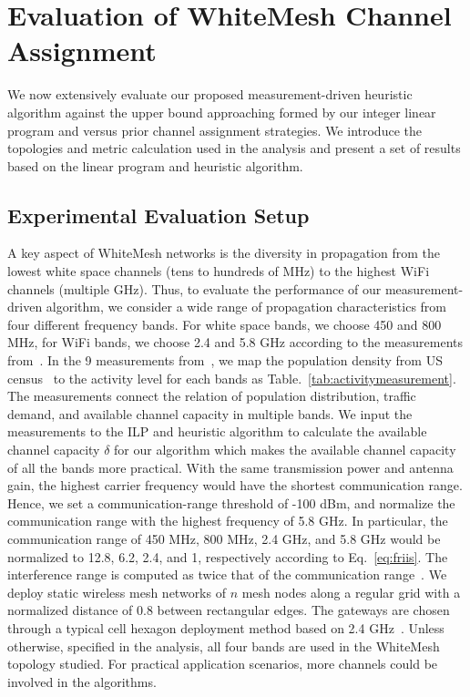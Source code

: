 \section{Evaluation of WhiteMesh Channel Assignment}
\label{sec:experimentdesign}


We now extensively evaluate our proposed measurement-driven heuristic 
algorithm against the upper bound approaching formed by our integer 
linear program and versus prior channel assignment strategies. We 
introduce the topologies and metric calculation used in the analysis 
and present a set of results based on the linear program and heuristic algorithm.

\subsection{Experimental Evaluation Setup}
\label{subsec:design}
A key aspect of WhiteMesh networks is the diversity in propagation from the lowest white
space channels (tens to hundreds of MHz) to the highest WiFi channels (multiple GHz). Thus, 
to evaluate the performance of our measurement-driven algorithm, we consider a wide range 
of propagation characteristics from four different frequency bands.  For white space bands, 
we choose 450 and 800 MHz, for WiFi bands, we choose 2.4 and 5.8 GHz according to the measurements
from~\cite{pcuiwinmee}. 
In the 9 measurements from~\cite{pcuiwinmee}, we map the population density from US 
census~\cite{uscensus} to the activity level for each bands as Table.~\ref{tab:activitymeasurement}.
The measurements connect the relation of population distribution, traffic demand,
and available channel capacity in multiple bands. 
We input the measurements to the ILP and heuristic algorithm to calculate
the available channel capacity $\delta$ for our algorithm which makes the available channel 
capacity of all the bands more practical. With the same transmission
power and antenna gain, the highest carrier frequency would have the shortest communication range.
Hence, we set a communication-range threshold of -100 dBm, and normalize the communication 
range with the highest frequency of 5.8 GHz. In particular, the communication range of 
450 MHz, 800 MHz, 2.4 GHz, and 5.8 GHz would be normalized to 12.8, 6.2, 2.4, and 1, respectively 
according to Eq.~\ref{eq:friis}. The interference range is computed as twice that of the communication 
range~\cite{raniwala2005architecture}. We deploy static wireless mesh networks of $n$ 
mesh nodes along a regular grid with a normalized distance of 0.8 between rectangular edges. 
The gateways are chosen through a typical cell hexagon deployment method based on 2.4 GHz~\cite{meguerdichian2001exposure}.
Unless otherwise, specified in the analysis, all four bands are used in the WhiteMesh
topology studied. For practical application scenarios, more channels could be involved in the 
algorithms.


